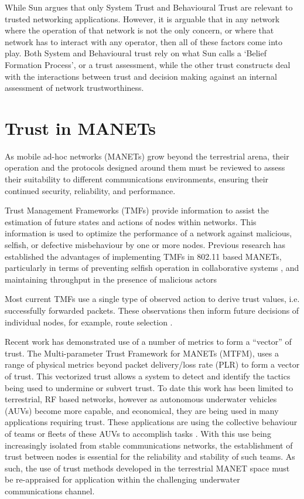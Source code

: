 While Sun argues that only System Trust and Behavioural Trust are relevant to trusted networking applications.
However, it is arguable that in any network where the operation of that network is not the only concern, or where that network has to interact with any operator, then all of these factors come into play.
Both System and Behavioural trust rely on what Sun calls a ‘Belief Formation Process’, or a trust assessment, while the other trust constructs deal with the interactions between trust and decision making against an internal assessment of network trustworthiness.


\section{Trust in MANETs}

As mobile ad-hoc networks (MANETs) grow beyond the terrestrial arena, their operation and the protocols designed around them must be reviewed to assess their suitability to different communications environments, ensuring their continued security, reliability, and performance.

Trust Management Frameworks (TMFs) provide information to assist the estimation of future states and actions of nodes within networks.
This information is used to optimize the performance of a network against malicious, selfish, or defective misbehaviour by one or more nodes.
Previous research has established the advantages of implementing TMFs in 802.11 based MANETs, particularly in terms of preventing selfish operation in collaborative systems \cite{Li2007}, and maintaining throughput in the presence of malicious actors \cite{Buchegger2002}

Most current TMFs use a single type of observed action to derive trust values, i.e. successfully forwarded packets. These observations then inform future decisions of individual nodes, for example, route selection \cite{Li2008}.

Recent work has demonstrated use of a number of metrics to form a ``vector'' of trust.
The Multi-parameter Trust Framework for MANETs (MTFM)\cite{Guo11}, uses a range of physical metrics beyond packet delivery/loss rate (PLR) to form a vector of trust.
This vectorized trust allows a system to detect and identify the tactics being used to undermine or subvert trust.
To date this work has been limited to terrestrial, RF based networks, however as autonomous underwater vehicles (AUVs) become more capable, and economical, they are being used in many applications requiring trust.
These applications are using the collective behaviour of teams or fleets of these AUVs to accomplish tasks \cite{Caiti2011}.
With this use being increasingly isolated from stable communications networks, the establishment of trust between nodes is essential for the reliability and stability of such teams.
As such, the use of trust methods developed in the terrestrial MANET space must be re-appraised for application within the challenging underwater communications channel.

